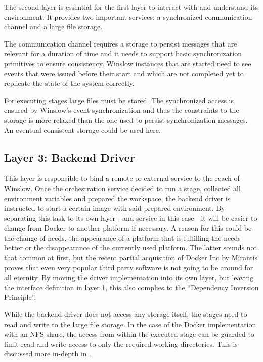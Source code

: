 The second layer is essential for the first layer to interact with and understand its environment.
It provides two important services: a synchronized communication channel and a large file storage.

The communication channel requires a storage to persist messages that are relevant for a duration of time and it needs to  support basic synchronization primitives to ensure consistency.
Winslow instances that are started need to see events that were issued before their start and which are not completed yet to replicate the state of the system correctly.

For executing stages large files must be stored.
The synchronized access is ensured by Winslow's event synchronization and thus the constraints to the storage is more relaxed than the one used to persist synchronization messages.
An eventual consistent storage could be used here. 


\subsection{Layer 3: Backend Driver}
\label{analysis:layer_3}


This layer is responsible to bind a remote or external service to the reach of Winslow.
Once the orchestration service decided to run a stage, collected all environment variables and prepared the workspace, the backend driver is instructed to start a certain image with said prepared environment.
By separating this task to its own layer - and service in this case - it will be easier to change from Docker to another platform if necessary.
A reason for this could be the change of needs, the appearance of a platform that is fulfilling the needs better or the disappearance of the currently used platform.
The latter sounds not that common at first, but the recent partial acquisition of Docker Inc by Mirantis\cite{docker:acquisition} proves that even very popular third party software is not going to be around for all eternity.
By moving the driver implementation into its own layer, but leaving the interface definition in layer 1, this also complies to the \enquote{Dependency Inversion Principle}. 

While the backend driver does not access any storage itself, the stages need to read and write to the large file storage.
In the case of the Docker implementation with an NFS share, the access from within the executed stage can be guarded to limit read and write access to only the required working directories.
This is discussed more in-depth in .

